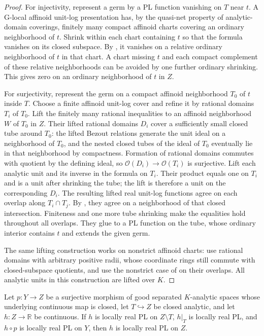 \documentclass[11pt,a4paper]{amsart}
\begin{document}
\begin{proof}
For injectivity, represent a germ by a PL function vanishing on $T$ near $t$. A G-local affinoid unit-log presentation has, by the quasi-net property of analytic-domain coverings, finitely many compact affinoid charts covering an ordinary neighborhood of $t$. Shrink within each chart containing $t$ so that the formula vanishes on its closed subspace. By , it vanishes on a relative ordinary neighborhood of $t$ in that chart. A chart missing $t$ and each compact complement of these relative neighborhoods can be avoided by one further ordinary shrinking. This gives zero on an ordinary neighborhood of $t$ in $Z$.

For surjectivity, represent the germ on a compact affinoid neighborhood $T_0$ of $t$ inside $T$. Choose a finite affinoid unit-log cover and refine it by rational domains $T_i$ of $T_0$. Lift the finitely many rational inequalities to an affinoid neighborhood $W$ of $T_0$ in $Z$. Their lifted rational domains $D_i$ cover a sufficiently small closed tube around $T_0$: the lifted Bezout relations generate the unit ideal on a neighborhood of $T_0$, and the nested closed tubes of the ideal of $T_0$ eventually lie in that neighborhood by compactness. Formation of rational domains commutes with quotient by the defining ideal, so $\mathcal O(D_i)\to\mathcal O(T_i)$ is surjective. Lift each analytic unit and its inverse in the formula on $T_i$. Their product equals one on $T_i$ and is a unit after shrinking the tube; the lift is therefore a unit on the corresponding $D_i$. The resulting lifted real unit-log functions agree on each overlap along $T_i\cap T_j$. By , they agree on a neighborhood of that closed intersection. Finiteness and one more tube shrinking make the equalities hold throughout all overlaps. They glue to a PL function on the tube, whose ordinary interior contains $t$ and extends the given germ.

The same lifting construction works on nonstrict affinoid charts: use rational domains with arbitrary positive radii, whose coordinate rings still commute with closed-subspace quotients, and use the nonstrict case of  on their overlaps. All analytic units in this construction are lifted over $K$.
\end{proof}

\begin{proposition}\label{prop:proper-modification-descent}
Let $p:Y\to Z$ be a surjective morphism of good separated $K$-analytic spaces whose underlying continuous map is closed, let $T\hookrightarrow Z$ be closed analytic, and let $h:Z\to\mathbb R$ be continuous. If $h$ is locally real PL on $Z\setminus T$, $h|_T$ is locally real PL, and $h\circ p$ is locally real PL on $Y$, then $h$ is locally real PL on $Z$.
\end{proposition}
\end{document}
